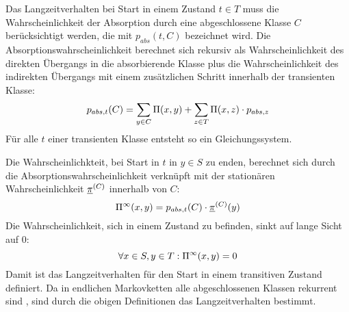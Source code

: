 \medskip
Das Langzeitverhalten bei Start in einem 
Zustand $t\in T$ muss die
Wahrscheinlichkeit der Absorption durch eine abgeschlossene Klasse $C$
berücksichtigt werden, die mit $p_{abs}(t,C)$ bezeichnet wird. Die
Absorptionswahrscheinlichkeit berechnet sich rekursiv als Wahrscheinlichkeit des
direkten Übergangs in die absorbierende Klasse plus die Wahrscheinlichkeit des
indirekten Übergangs mit einem zusätzlichen Schritt innerhalb der transienten
Klasse:
\[
p_{abs,t}(C) = \sum_{y\in C} \Pi(x,y) + \sum_{z\in T}\Pi(x,z)\cdot p_{abs,z} \\
\]
Für alle $t$ einer transienten Klasse entsteht so ein Gleichungssystem.

Die Wahrscheinlichkteit, bei Start in $t$ in $y\in S$ zu
enden, berechnet sich durch die Absorptionswahrscheinlichkeit verknüpft mit
der stationären Wahrscheinlichkeit $\underline{\pi}^{(C)}$ innerhalb von $C$:
\begin{equation}\label{eq:lzv-trans-abg}
\Pi^\infty(x,y) = p_{abs,t}(C)\cdot\underline{\pi}^{(C)}(y)
\end{equation}
Die Wahrscheinlichkeit, sich in einem 
Zustand zu befinden, sinkt auf lange Sicht auf 0:
\begin{equation}\label{eq:lzv-trans-trans}
\forall x\in S, y\in T: \Pi^\infty(x, y) = 0
\end{equation}
Damit ist das Langzeitverhalten für den Start in einem transitiven Zustand
definiert.
Da in endlichen Markovketten alle abgeschlossenen Klassen rekurrent sind
, sind
durch die obigen Definitionen das Langzeitverhalten bestimmt.

